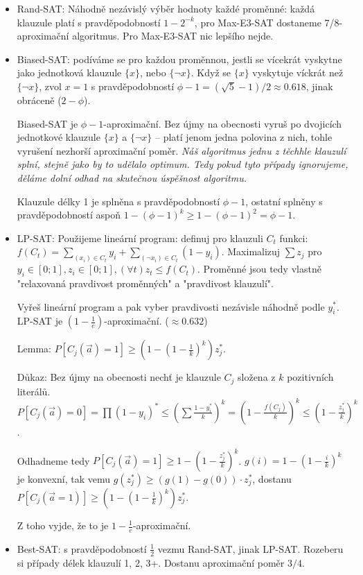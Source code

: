 \documentclass[a4paper,10pt,titlepage]{article} \usepackage[utf8]{inputenc}
\begin{document}
\begin{itemize}
\item Rand-SAT: Náhodně nezávislý výběr hodnoty každé proměnné: každá klauzule
	platí s pravděpodobností $1-2^{-k}$, pro Max-E3-SAT dostaneme
	7/8-aproximační algoritmus. Pro Max-E3-SAT nic lepšího nejde.

\item Biased-SAT: podíváme se pro každou proměnnou, jestli se vícekrát vyskytne
	jako jednotková klauzule $\{x\}$, nebo $\{\neg x\}$. Když se $\{x\}$ vyskytuje
	víckrát než $\{\neg x\}$, zvol $x=1$ s pravděpodobností
	$\phi-1=(\sqrt{5}-1)/2\approx 0.618$, jinak obráceně ($2-\phi$).

	Biased-SAT je $\phi-1$-aproximační.
	Bez újmy na obecnosti vyruš po dvojicích jednotkové klauzule $\{x\}$
	a $\{\neg x\}$ -- platí jenom jedna polovina z nich, tohle vyrušení
	nezhorší aproximační poměr.
	\textit{Náš algoritmus jednu z těchhle 
	klauzulí splní, stejně jako by to udělalo optimum. Tedy pokud tyto případy
	ignorujeme, děláme dolní odhad na skutečnou úspěšnost algoritmu.}

	Klauzule délky 1 je splněna s pravděpodobností $\phi-1$,
	ostatní splněny s pravděpodobností aspoň $1-(\phi-1)^k\geq
	1-(\phi-1)^2=\phi-1$.

\item LP-SAT: Použijeme lineární program:
	definuj pro klauzuli $C_t$ funkci:
	$f(C_t)=\sum_{(x_i)\in C_t} y_i + \sum_{(\neg x_i)\in C_t} (1-y_i)$.
	Maximalizuj $\sum z_j$ pro $y_i\in [0;1], z_i\in [0;1],
	(\forall t) z_t\leq f(C_t)$.
	Proměnné jsou tedy vlastně "relaxovaná pravdivost proměnných" a
	"pravdivost klauzulí".

	Vyřeš lineární program a pak vyber pravdivosti nezávisle náhodně
	podle $y_i^*$.
	LP-SAT je $(1-\frac{1}{e})$-aproximační. ($\approx 0.632$)

	Lemma: $P[C_j(\overrightarrow{a})=1]\geq (1-(1-\frac{1}{k})^k)z_j^*$.

	Důkaz: Bez újmy na obecnosti nechť je klauzule $C_j$ složena
	z $k$ pozitivních literálů. $P[C_j(\overrightarrow{a})=0]=
	\prod(1-y_i)^*\leq
	(\sum{\frac{1-y_i^*}{k}})^k=(1-\frac{f(C_j)}{k})^k\leq
	(1-\frac{z_j^*}{k})^k$.

	Odhadneme tedy $P[C_j(\overrightarrow{a})=1]\geq
	1-(1-\frac{z_j^*}{k})^k$. $g(i)=1-(1-\frac{i}{k})^k$ je konvexní,
	tak vemu $g(z_j^*)\geq (g(1)-g(0))\cdot z_j^*$, dostanu
	$P[C_j(\overrightarrow{a}=1)]\geq (1-(1-\frac{1}{k})^k)z_j^*$.

	Z toho vyjde, že to je $1-\frac{1}{e}$-aproximační.

\item Best-SAT: s pravděpodobností $\frac{1}{2}$ vezmu Rand-SAT, jinak LP-SAT.
	Rozeberu si případy délek klauzulí 1, 2, 3+.
	Dostanu aproximační poměr $3/4$.
\end{itemize}
\end{document}
